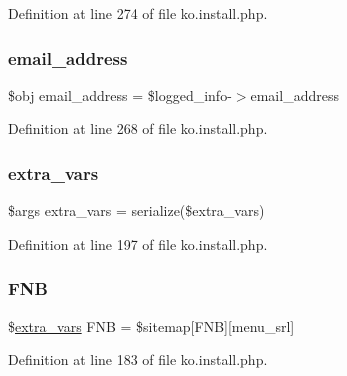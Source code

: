 Definition at line 274 of file ko.\+install.\+php.

\hypertarget{ko_8install_8php_a1dffea0d5ba8194f8ef01f414af0c831}{}\label{ko_8install_8php_a1dffea0d5ba8194f8ef01f414af0c831} 
\subsubsection{\texorpdfstring{email\+\_\+address}{email\_address}}
{\footnotesize\ttfamily \$obj email\+\_\+address = \$logged\+\_\+info-\/$>$email\+\_\+address}



Definition at line 268 of file ko.\+install.\+php.

\hypertarget{ko_8install_8php_ae1dcb37fc34a8f312d2e6abd6f806743}{}\label{ko_8install_8php_ae1dcb37fc34a8f312d2e6abd6f806743} 
\subsubsection{\texorpdfstring{extra\+\_\+vars}{extra\_vars}}
{\footnotesize\ttfamily \$args extra\+\_\+vars = serialize(\$extra\+\_\+vars)}



Definition at line 197 of file ko.\+install.\+php.

\hypertarget{ko_8install_8php_a683e060c22be3e658be6f9751a2082f0}{}\label{ko_8install_8php_a683e060c22be3e658be6f9751a2082f0} 
\subsubsection{\texorpdfstring{F\+NB}{FNB}}
{\footnotesize\ttfamily \$\hyperlink{ko_8install_8php_ae1dcb37fc34a8f312d2e6abd6f806743}{extra\+\_\+vars} F\+NB = \$sitemap\mbox{[}\textquotesingle{}F\+NB\textquotesingle{}\mbox{]}\mbox{[}\textquotesingle{}menu\+\_\+srl\textquotesingle{}\mbox{]}}



Definition at line 183 of file ko.\+install.\+php.

\hypertarget{ko_8install_8php_a9b1716b68fc04f3492448f38148dcbf5}{}\label{ko_8install_8php_a9b1716b68fc04f3492448f38148dcbf5} 
